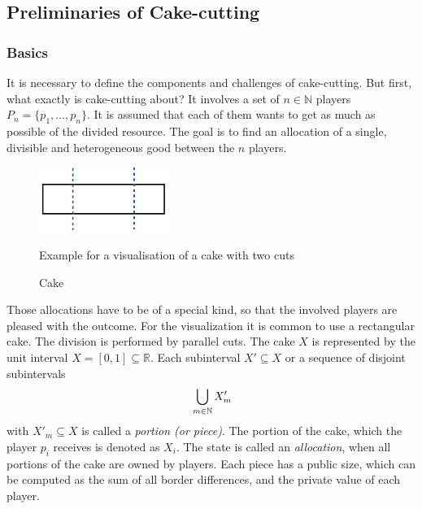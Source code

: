 \newpage
\subsection{Preliminaries of Cake-cutting}
\subsubsection{Basics}
It is necessary to define the components and challenges of cake-cutting. But first, what exactly is cake-cutting about? It involves a set of $n \in \mathbb{N}$ players $P_n=\{p_1,\ldots,p_n\}$. It is assumed that each of them wants to get as much as possible of the divided resource. The goal is to find an allocation of a single, divisible and heterogeneous good between the $n$ players.\\ 
	\begin{figure}[h]
		\centering
 		 \includegraphics[width=120pt]{kek.pdf}
   \caption{Cake}Example for a visualisation of a cake with two cuts
  	 \end{figure} 
Those allocations have to be of a special kind, so that the involved players are pleased with the outcome. For the visualization it is common to use a rectangular cake. The division is performed by parallel cuts. The cake $X$ is represented by the unit interval $X=[0,1] \subseteq \mathbb{R}$. Each subinterval $X'\subseteq X$ or a sequence of disjoint subintervals $$\sideset{}{ }\bigcup\limits_{m\in\mathbb{N}}X'_m$$
with $X'_m\subseteq X$ is called a \emph{portion (or piece)}. The portion of the cake, which the player $p_i$ receives is denoted as $X_i$. The state is called an \emph{allocation}, when all portions of the cake are owned by players. Each piece has a public size, which can be computed as the sum of all border differences, and the private value of each player.\\

